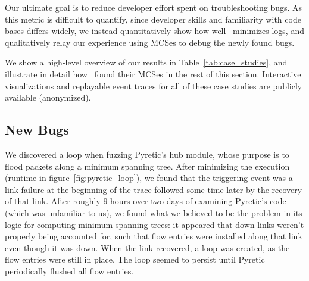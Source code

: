 Our ultimate goal is to reduce developer effort spent on troubleshooting bugs.
As this metric is difficult to quantify, since developer skills and
familiarity with code bases differs widely, we instead
quantitatively show how well \projectname~minimizes logs,
and qualitatively relay our experience using MCSes to debug the newly found bugs.


We show a high-level overview
of our results in Table~\ref{tab:case_studies}, and
illustrate in detail how \projectname~found their MCSes
in the rest of this section. Interactive visualizations and replayable event traces
for all of these case studies are publicly available (anonymized).

\subsection{New Bugs}

 We discovered a loop when fuzzing Pyretic's hub
module, whose purpose is to flood packets along a minimum spanning tree. After
minimizing the execution (runtime in figure~\ref{fig:pyretic_loop}), we found that the triggering event
was a link failure at the beginning of the trace followed some time later by
the recovery of that link. After roughly 9 hours over two days of examining
Pyretic's code (which was unfamiliar to us), we found what we believed to be the problem
in its logic for computing minimum spanning trees: it appeared that down links
weren't properly being accounted for, such that flow entries were installed
along that link even though it was down. When the link recovered, a loop was
created, as the flow entries were still in place. The loop seemed to persist until
Pyretic periodically flushed all flow entries.

